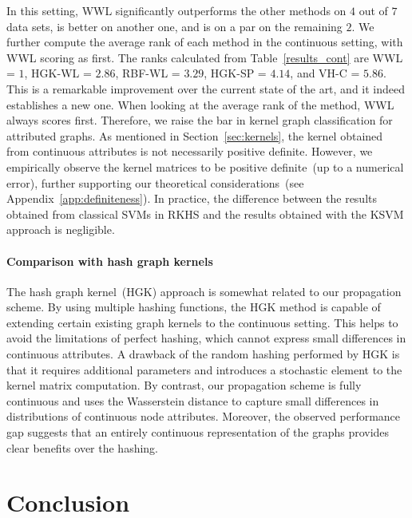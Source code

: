 \documentclass{article}
\begin{document}
In this setting, WWL significantly outperforms the other methods on $4$ out of $7$ data sets, is better on another one, and is on a par on the remaining $2$. We further compute the average rank of each method in the continuous setting, with WWL scoring as first. The ranks calculated from Table~\ref{results_cont} are WWL = $1$, HGK-WL = $2.86$, RBF-WL = $3.29$, HGK-SP = $4.14$, and VH-C = $5.86$.  This is a remarkable improvement over the current state of the art, and it indeed establishes a new one. When looking at the average rank of the method, WWL always scores first. Therefore, we raise the bar in kernel graph classification for attributed graphs. As mentioned in Section~\ref{sec:kernels}, the kernel obtained from continuous attributes is not necessarily positive definite. However, we empirically observe the kernel matrices to be positive definite~(up to a numerical error), further supporting our theoretical considerations~(see Appendix~\ref{app:definiteness}).
In practice, the difference between the results obtained from classical SVMs in RKHS and the results obtained with the KSVM approach is negligible.

\paragraph{Comparison with hash graph kernels }
The hash graph kernel~(HGK) approach is somewhat related to our propagation scheme. By using multiple hashing functions, the HGK method is capable of extending certain existing graph kernels to the continuous setting. This helps to avoid the limitations of perfect hashing, which cannot express small differences in continuous attributes. A drawback of the random hashing performed by HGK is that it requires additional parameters and introduces a stochastic element to the kernel matrix computation. By contrast, our propagation scheme is fully continuous and uses the Wasserstein distance to capture small differences in distributions of continuous node attributes. Moreover, the observed performance gap suggests that an entirely continuous representation of the graphs provides clear benefits over the hashing.


\section{Conclusion}
\label{sec:conclusion}
\end{document}
